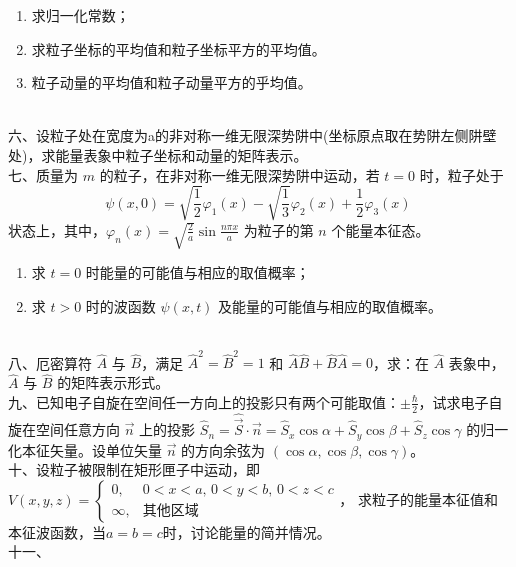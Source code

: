 \begin{enumerate}
    \item 求归一化常数；
    \item 求粒子坐标的平均值和粒子坐标平方的平均值。
    \item 粒子动量的平均值和粒子动量平方的乎均值。
\end{enumerate}\\
六、设粒子处在宽度为a的非对称一维无限深势阱中(坐标原点取在势阱左侧阱壁处)，求能量表象中粒子坐标和动量的矩阵表示。\\
七、质量为 $m$ 的粒子，在非对称一维无限深势阱中运动，若 $t=0$ 时，粒子处于
\[
\psi(x,0) = \sqrt{\frac{1}{2}} \varphi_1(x) - \sqrt{\frac{1}{3}} \varphi_2(x) + \frac{1}{2} \varphi_3(x)~
\]
状态上，其中，$\varphi_n(x) = \sqrt{\frac{2}{a}} \sin \frac{n\pi x}{a}$ 为粒子的第 $n$ 个能量本征态。

\begin{enumerate}
    \item 求 $t=0$ 时能量的可能值与相应的取值概率；
    \item 求 $t>0$ 时的波函数 $\psi(x,t)$ 及能量的可能值与相应的取值概率。
\end{enumerate}\\
八、厄密算符 $\hat{A}$ 与 $\hat{B}$，满足 $\hat{A}^2 = \hat{B}^2 = 1$ 和 $\hat{A}\hat{B} + \hat{B}\hat{A} = 0$，求：在 $\hat{A}$ 表象中，$\hat{A}$ 与 $\hat{B}$ 的矩阵表示形式。\\
九、已知电子自旋在空间任一方向上的投影只有两个可能取值：$\pm \frac{\hbar}{2}$，试求电子自旋在空间任意方向 $\vec{n}$ 上的投影 $\hat S_n = \hat{\vec{S}} \cdot \vec{n} =\hat S_x \cos \alpha + \hat S_y \cos \beta + \hat S_z \cos \gamma$ 的归一化本征矢量。设单位矢量 $\vec{n}$ 的方向余弦为 $(\cos \alpha, \cos \beta, \cos \gamma)$。\\
十、设粒子被限制在矩形匣子中运动，即 $V(x,y,z) = 
\begin{cases} 
0, & 0 < x < a, \, 0 < y < b, \, 0 < z < c \\
\infty, & \text{其他区域}
\end{cases}$，
求粒子的能量本征值和本征波函数，当$a=b=c$时，讨论能量的简并情况。\\
十一、
